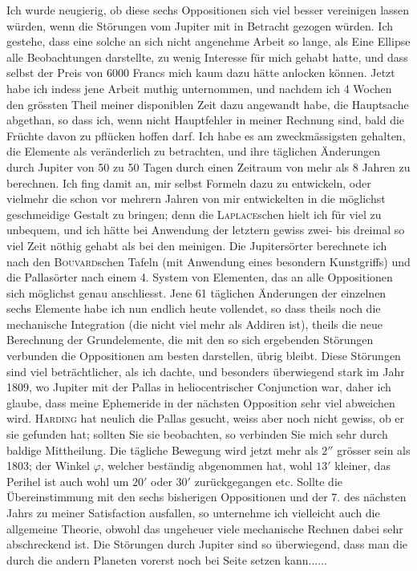 \noindent\hspace*{\parindent}Ich wurde neugierig, ob diese sechs Oppositionen sich viel besser vereinigen lassen würden, wenn die Störungen vom Jupiter mit in Betracht gezogen würden. Ich gestehe, dass eine solche an sich nicht angenehme Arbeit so lange, als Eine Ellipse alle Beobachtungen darstellte, zu wenig Interesse für mich gehabt hatte, und dass selbst der Preis von 6000 Francs mich kaum dazu hätte anlocken können. Jetzt habe ich indess jene Arbeit muthig unternommen, und nachdem ich 4 Wochen den grössten Theil meiner disponiblen Zeit dazu angewandt habe, die Hauptsache abgethan, so dass ich, wenn nicht Hauptfehler in meiner Rechnung sind, bald die Früchte davon zu pflücken hoffen darf. Ich habe es am zweckmässigsten gehalten, die Elemente als veränderlich zu betrachten, und ihre täglichen Änderungen durch Jupiter von 50 zu 50 Tagen durch einen Zeitraum von mehr als 8 Jahren zu berechnen. Ich fing damit an, mir selbst Formeln dazu zu entwickeln, oder vielmehr die schon vor mehrern Jahren von mir entwickelten in die möglichst geschmeidige Gestalt zu bringen; denn die \textsc{Laplace}schen hielt ich für viel zu unbequem, und ich hätte bei Anwendung der letztern gewiss zwei- bis dreimal so viel Zeit nöthig gehabt als bei den meinigen. Die Jupitersörter berechnete ich nach den \textsc{Bouvard}schen Tafeln (mit Anwendung eines besondern Kunstgriffs\HistoricalNoteDouble{Vgl. S. 475 dieses Bandes.]}) und die Pallasörter nach einem 4. System von Elementen, das an alle Oppositionen sich möglichst genau anschliesst. Jene 61 täglichen Änderungen der einzelnen sechs Elemente habe ich nun endlich heute vollendet, so dass theils noch die mechanische Integration (die nicht viel mehr als Addiren ist), theils die neue Berechnung der Grundelemente, die mit den so sich ergebenden Störungen verbunden die Oppositionen am besten darstellen, übrig bleibt. Diese Störungen sind viel beträchtlicher, als ich dachte, und besonders überwiegend stark im Jahr 1809, wo Jupiter mit der Pallas in heliocentrischer Conjunction war, daher ich glaube, dass meine Ephemeride in der nächsten Opposition sehr viel abweichen wird. \textsc{Harding} hat neulich die Pallas gesucht, weiss aber noch nicht gewiss, ob er sie gefunden hat; sollten Sie sie beobachten, so verbinden Sie mich sehr durch baldige Mittheilung. Die tägliche Bewegung wird jetzt mehr als \(2''\) grösser sein als 1803; der Winkel \(\varphi\), welcher beständig abgenommen hat, wohl \(13'\) kleiner, das Perihel ist auch wohl um \(20'\) oder \(30'\) zurückgegangen etc. Sollte die Übereinstimmung mit den sechs bisherigen Oppositionen und der 7. des nächsten Jahrs zu meiner Satisfaction ausfallen, so unternehme ich vielleicht auch die allgemeine Theorie, obwohl das ungeheuer viele mechanische Rechnen dabei sehr abschreckend ist. Die Störungen durch Jupiter sind so überwiegend, dass man die durch die andern Planeten vorerst noch bei Seite setzen kann.\quad.\quad.\quad.\quad.\quad.
